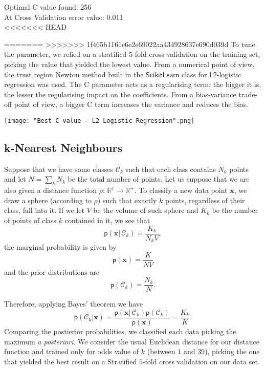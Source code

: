 \documentclass[a4paper]{article}
\begin{document}
Optimal C value found: 256\\
At Cross Validation error value: 0.011\\
<<<<<<< HEAD

=======
>>>>>>> 1f465b1161c6e2e69022aa434928637e690d039d
To tune the parameter, we relied on a stratified 5-fold cross-validation
on the training set, picking the value that yielded the lowest value.
From a numerical point of view, the trust region Newton method built
in the $\mathsf{ScikitLearn}$ class for $\mathsf{L2}$-logistic regression
was used.
The C parameter acts as a regularising term: the bigger it is, the lesser the regularising impact on the coefficients.
From a bias-variance trade-off point of view, a bigger C term increases the variance and reduces the bias.

\texttt{[image: "Best C value - L2 Logistic Regression".png]}

\subsection{k-Nearest Neighbours}

Suppose that we have some classes $\mathcal{C}_{k}$ such that each
class contains $N_{k}$ points and let $N=\sum_{k}N_{k}$ be the total
number of points. Let us suppose that we are also given a distance
function $\rho:\,\mathbb{R}^{r}\rightarrow\mathbb{R}^{+}$. To classify
a new data point $\mathbf{x}$, we draw a sphere (according to $\rho$)
such that exactly $k$ points, regardless of their class, fall into
it. If we let $V$ be the volume of such sphere and $K_{k}$ be the
number of points of class $k$ contained in it, we see that 
\begin{equation}
\mathsf{p}\left(\mathbf{x}|\,\mathcal{C}_{k}\right)=\frac{K_{k}}{N_{k}V},\label{eq:-10}
\end{equation}
the marginal probability is given by 
\begin{equation}
\mathsf{p}\left(\mathbf{x}\right)=\frac{K}{NV}\label{eq:-11}
\end{equation}
and the prior distributions are 
\begin{equation}
\mathsf{p}\left(\mathcal{C}_{k}\right)=\frac{N_{k}}{N}.\label{eq:-12}
\end{equation}

Therefore, applying Bayes' theorem we have 
\begin{equation}
\mathsf{p}\left(\mathcal{C}_{k}|\mathbf{x}\right)=\frac{\mathsf{p}\left(\mathbf{x}|\,\mathcal{C}_{k}\right)\mathsf{p}\left(\mathcal{C}_{k}\right)}{\mathsf{p}\left(\mathbf{x}\right)}=\frac{K_{k}}{K}.\label{eq:-13}
\end{equation}
Comparing the postierior probabilities, we classified each data picking
the maximum \textit{a posteriori}. We consider the usual Euclidean
distance for our distance function and trained only for odds value
of $k$ (between $1$ and $39$), picking the one that yielded the
best result on a Stratified $5$-fold cross validation on our data
set.
\end{document}
